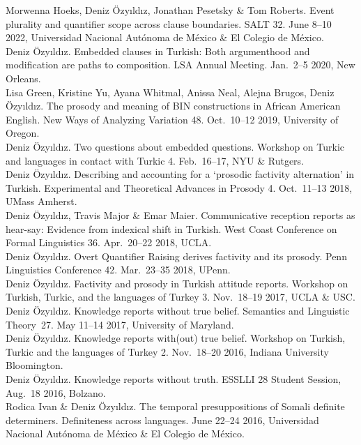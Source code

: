 \documentclass[11pt, a4paper]{article} %
\newcommand{\years}[1]{\marginnote{\scriptsize #1}} %
\newcommand{\me}{Deniz \"Ozy\i{}ld\i{}z}
\begin{document}
Morwenna Hoeks, Deniz \"Ozy\i{}ld\i{}z, Jonathan Pesetsky \& Tom Roberts. Event plurality and quantifier scope across clause boundaries. SALT 32. June 8--10 2022, Universidad Nacional Aut\'onoma de M\'exico \& El Colegio de M\'exico.\\[.25em]
\years{2020} \me. Embedded clauses in Turkish: Both argumenthood and modification are paths to composition. LSA Annual Meeting. Jan.\ 2--5 2020, New Orleans.\\[.25em]
\years{2019}  Lisa Green, Kristine Yu, Ayana Whitmal, Anissa Neal, Alejna Brugos, Deniz \"Ozy\i{}ld\i{}z. The prosody and meaning of BIN constructions in African American English. New Ways of Analyzing Variation 48. Oct.\ 10--12 2019, University of Oregon.\\ [.25em]
\me. Two questions about embedded questions. Workshop on Turkic and languages in contact with Turkic 4. Feb.\ 16--17, NYU \& Rutgers.\\[.25em]
\me. Describing and accounting for a `prosodic factivity alternation' in Turkish.  Experimental and Theoretical Advances in Prosody 4. Oct.\ 11--13 2018, UMass Amherst.\\[.25em]
\me, Travis Major \& Emar Maier. Communicative reception reports as hear-say: Evidence from indexical shift in Turkish. West Coast Conference on Formal Linguistics 36. Apr.\ 20--22 2018, UCLA.\\[.25em]
\me. Overt Quantifier Raising derives factivity and its prosody. Penn Linguistics Conference 42. Mar.\ 23--35 2018, UPenn.\\[.25em]
\years{2017} \me. Factivity and prosody in Turkish attitude reports. Workshop on Turkish, Turkic, and the languages of Turkey 3. Nov.\ 18--19 2017, UCLA \& USC.\\[.25em]
\me. Knowledge reports without true belief. Semantics and Linguistic Theory~27.
May 11--14 2017, University of Maryland.\\[.25em]
\years{2016} \me. Knowledge reports with(out) true belief. Workshop on Turkish, Turkic and the languages of Turkey 2. Nov.\ 18--20 2016, Indiana University Bloomington.\\[.25em]
\me. Knowledge reports without truth. ESSLLI 28 Student Session, Aug.\ 18 2016, Bolzano.\\[.25em]
Rodica Ivan \& Deniz \"Ozy\i{}ld\i{}z. The temporal presuppositions of Somali definite determiners. Definiteness across languages. June 22--24 2016, Universidad Nacional Aut\'onoma de M\'exico \& El Colegio de M\'exico.\\[.25em]
\end{document}

